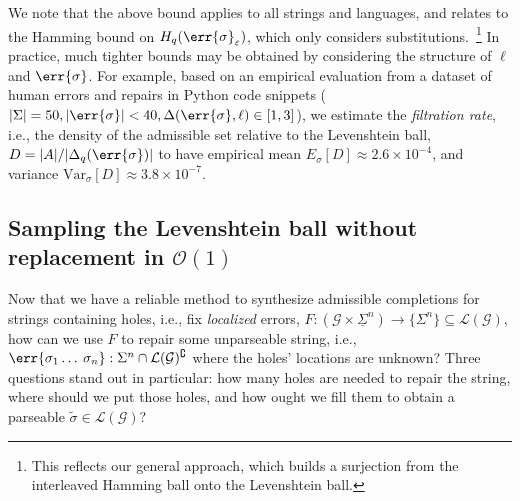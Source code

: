 \documentclass[runningheads]{llncs}
\begin{document}
We note that the above bound applies to all strings and languages, and relates to the Hamming bound on $H_q(\err{\sigma}_\varepsilon)$, which only considers substitutions.~\footnote{This reflects our general approach, which builds a surjection from the interleaved Hamming ball onto the Levenshtein ball.} In practice, much tighter bounds may be obtained by considering the structure of $\ell$ and $\err{\sigma}$. For example, based on an empirical evaluation from a dataset of human errors and repairs in Python code snippets ($|\Sigma| = 50, |\err{\sigma}| < 40, \Delta(\err{\sigma}, \ell) \in [1, 3]$), we estimate the \textit{filtration rate}, i.e., the density of the admissible set relative to the Levenshtein ball, $D=|A|/|\Delta_q(\err{\sigma})|$ to have empirical mean $E_\sigma[D] \approx 2.6\times 10^{-4}$, and variance $\mathrm{Var}_\sigma[D] \approx 3.8\times10^{-7}$.


\pagebreak\subsection{Sampling the Levenshtein ball without replacement in $\mathcal{O}(1)$}\label{sec:dsi}

Now that we have a reliable method to synthesize admissible completions for strings containing holes, i.e., fix \textit{localized} errors, $F: (\mathcal{G} \times \underline\Sigma^n) \rightarrow \{\Sigma^n\}\subseteq \mathcal{L}(\mathcal{G})$, how can we use $F$ to repair some unparseable string, i.e., $\err{\sigma_1\ldots\:\sigma_n}: \Sigma^n \cap\mathcal{L}(\mathcal{G})^\complement$ where the holes' locations are unknown? Three questions stand out in particular: how many holes are needed to repair the string, where should we put those holes, and how ought we fill them to obtain a parseable $\tilde{\sigma} \in \mathcal{L}(\mathcal{G})$?
\end{document}
